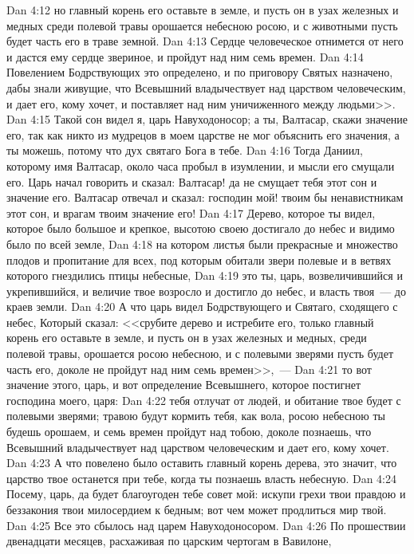 \vs Dan 4:12 но главный корень его оставьте в земле, и пусть он в узах железных и медных среди полевой травы орошается небесною росою, и с животными пусть будет часть его в траве земной.
\vs Dan 4:13 Сердце человеческое отнимется от него и дастся ему сердце звериное, и пройдут над ним семь времен.
\vs Dan 4:14 Повелением Бодрствующих это определено, и по приговору Святых назначено, дабы знали живущие, что Всевышний владычествует над царством человеческим, и дает его, кому хочет, и поставляет над ним уничиженного между людьми>>.
\vs Dan 4:15 Такой сон видел я, царь Навуходоносор; а ты, Валтасар, скажи значение его, так как никто из мудрецов в моем царстве не мог объяснить его значения, а ты можешь, потому что дух святаго Бога в тебе.
\rsbpar\vs Dan 4:16 Тогда Даниил, которому имя Валтасар, около часа пробыл в изумлении, и мысли его смущали его. Царь начал говорить и сказал: Валтасар! да не смущает тебя этот сон и значение его. Валтасар отвечал и сказал: господин мой! твоим бы ненавистникам этот сон, и врагам твоим значение его!
\vs Dan 4:17 Дерево, которое ты видел, которое было большое и крепкое, высотою своею достигало до небес и видимо было по всей земле,
\vs Dan 4:18 на котором листья были прекрасные и множество плодов и пропитание для всех, под которым обитали звери полевые и в ветвях которого гнездились птицы небесные,
\vs Dan 4:19 это ты, царь, возвеличившийся и укрепившийся, и величие твое возросло и достигло до небес, и власть твоя~--- до краев земли.
\vs Dan 4:20 А что царь видел Бодрствующего и Святаго, сходящего с небес, Который сказал: <<срубите дерево и истребите его, только главный корень его оставьте в земле, и пусть он в узах железных и медных, среди полевой травы, орошается росою небесною, и с полевыми зверями пусть будет часть его, доколе не пройдут над ним семь времен>>,~---
\vs Dan 4:21 то вот значение этого, царь, и вот определение Всевышнего, которое постигнет господина моего, царя:
\vs Dan 4:22 тебя отлучат от людей, и обитание твое будет с полевыми зверями; травою будут кормить тебя, как вола, росою небесною ты будешь орошаем, и семь времен пройдут над тобою, доколе познаешь, что Всевышний владычествует над царством человеческим и дает его, кому хочет.
\vs Dan 4:23 А что повелено было оставить главный корень дерева, это значит, что царство твое останется при тебе, когда ты познаешь власть небесную.
\vs Dan 4:24 Посему, царь, да будет благоугоден тебе совет мой: искупи грехи твои правдою и беззакония твои милосердием к бедным; вот чем может продлиться мир твой.
\vs Dan 4:25 Все это сбылось над царем Навуходоносором.
\rsbpar\vs Dan 4:26 По прошествии двенадцати месяцев, расхаживая по царским чертогам в Вавилоне,
